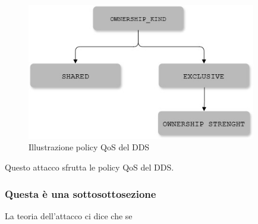 %     


\begin{figure}[H]
	\centering
    \includegraphics[width=10cm, keepaspectratio]{img/Policy QoS DDS_2.jpg}
	\caption{Illustrazione policy QoS del DDS}\label{Mappa QoS}
\end{figure}

Questo attacco sfrutta le policy QoS del DDS.


\subsubsection{Questa è una sottosottosezione}
La teoria dell'attacco ci dice che se 


\setlength{\arrayrulewidth}{1.0pt} %


